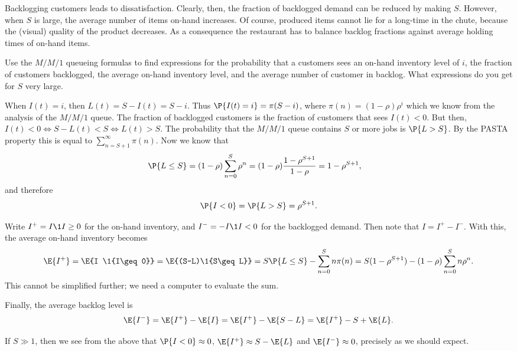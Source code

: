 \begin{exercise}  
Backlogging customers leads to dissatisfaction.
 Clearly, then, the fraction of backlogged demand can be reduced by making $S$.
 However, when $S$ is large, the average number of items on-hand increases.
 Of course, produced items cannot lie for a long-time in the chute, because the (visual) quality of the product decreases.
 As a consequence the restaurant has to balance backlog fractions against average holding times of on-hand items. 

 Use the $M/M/1$ queueing formulas to find expressions for the probability that a customers sees an on-hand inventory level of $i$, the fraction of customers backlogged, the average on-hand inventory level, and the average number of customer in backlog.
 What expressions do you get for $S$ very large.
\begin{solution}
 When $I(t)=i$, then $L(t) = S-I(t) = S -i$.
 Thus $\P{I(t) = i} = \pi(S-i)$, where $\pi(n) = (1-\rho)\rho^i$ which we know from the analysis of the $M/M/1$ queue.
 The fraction of backlogged customers is the fraction of customers that sees $I(t) < 0$.
 But then, $I(t) < 0 \iff S - L(t) < S \iff L(t) > S$.
 The probability that the $M/M/1$ queue contains $S$ or more jobs is $\P{L> S}$.
 By the PASTA property this is equal to $\sum_{n=S+1}^\infty \pi(n)$.
 Now we know that
 \begin{align*}
 \P{L\leq S} &= (1-\rho)\sum_{n=0}^S \rho^n = (1-\rho)\frac{1-\rho^{S+1}}{1-\rho} = 1-\rho^{S+1},
 \end{align*}
 and therefore
 \begin{align*}
\P{I<0} = \P{L>S} = \rho^{S+1}.
 \end{align*}

Write $I^+ = I\1{I\geq0}$ for the on-hand inventory, and $I^- = -I\1{I<0}$ for the backlogged demand.
Then note that $I=I^+ - I^-$.
With this, the average on-hand inventory becomes
\begin{align*}
\E{I^+} = \E{I \1{I\geq 0}} = \E{(S-L)\1{S\geq L}} = S\P{L\leq S} - \sum_{n=0}^S n \pi(n) = S(1-\rho^{S+1}) - 
 (1-\rho) \sum_{n=0}^S n\rho^n.
\end{align*}
This cannot be simplified further; we need a computer to evaluate the sum. 

Finally, the average backlog level is
\begin{align*}
 \E{I^-} = \E{I^+} - \E{I} = \E{I^+} - \E{S-L} = \E{I^+} - S + \E{L}.
\end{align*}

If $S\gg 1$, then we see from the above that $\P{I<0} \approx 0$, $\E{I^+} \approx S -\E{L}$ and $\E{I^-} \approx 0$, precisely as we should expect. 
\end{solution}
\end{exercise}


